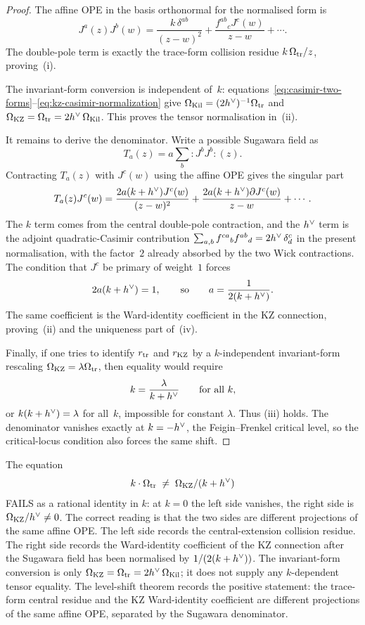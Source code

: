 \begin{proof}
The affine OPE in the basis orthonormal for the normalised form is
\[
 J^a(z)J^b(w)
 =
 \frac{k\,\delta^{ab}}{(z-w)^2}
 +\frac{f^{ab}{}_cJ^c(w)}{z-w}
 +\cdots .
\]
The double-pole term is exactly the trace-form collision residue
$k\,\Omega_{\mathrm{tr}}/z$, proving~(i).

The invariant-form conversion is independent of~$k$:
equations~\eqref{eq:casimir-two-forms}--\eqref{eq:kz-casimir-normalization}
give $\Omega_{\mathrm{Kil}}=(2h^{\vee})^{-1}\Omega_{\mathrm{tr}}$ and
$\Omega_{\mathrm{KZ}}=\Omega_{\mathrm{tr}}=2h^{\vee}\,\Omega_{\mathrm{Kil}}$. This proves the tensor
normalisation in~(ii).

It remains to derive the denominator. Write a possible Sugawara field
as
\[
 T_a(z)=a\sum_b :J^bJ^b:(z).
\]
Contracting $T_a(z)$ with $J^c(w)$ using the affine OPE gives the
singular part
\[
 T_a(z)J^c(w)
 =
 \frac{2a(k+h^{\vee})J^c(w)}{(z-w)^2}
 +\frac{2a(k+h^{\vee})\partial J^c(w)}{z-w}
 +\cdots .
\]
The $k$ term comes from the central double-pole contraction, and the
$h^{\vee}$ term is the adjoint quadratic-Casimir contribution
$\sum_{a,b} f^{ca}{}_b f^{ab}{}_d = 2h^{\vee}\,\delta^c_d$ in the present
normalisation, with the factor~$2$ already absorbed by the two Wick
contractions. The condition that $J^c$ be primary of weight~$1$ forces
\[
 2a(k+h^{\vee})=1,
 \qquad\text{so}\qquad
 a=\frac{1}{2(k+h^{\vee})}.
\]
The same coefficient is the Ward-identity coefficient in the KZ
connection, proving~(ii) and the uniqueness part of~(iv).

Finally, if one tries to identify $r_{\mathrm{tr}}$ and $r_{\mathrm{KZ}}$ by a
$k$-independent invariant-form rescaling $\Omega_{\mathrm{KZ}}=\lambda\Omega_{\mathrm{tr}}$,
then equality would require
\[
 k=\frac{\lambda}{k+h^{\vee}}
 \qquad\text{for all }k,
\]
or $k(k+h^{\vee})=\lambda$ for all~$k$, impossible for constant
$\lambda$. Thus (iii) holds. The denominator vanishes exactly at
$k=-h^{\vee}$, the Feigin--Frenkel critical level, so the critical-locus
condition also forces the same shift.
\end{proof}

\begin{remark}
\label{rem:basis-vs-identity}
The equation
\[
 k \cdot \Omega_{\mathrm{tr}} \;\neq\; \Omega_{\mathrm{KZ}} / (k + h^{\vee})
\]
FAILS as a rational identity in $k$: at $k = 0$ the left side vanishes,
the right side is $\Omega_{\mathrm{KZ}} / h^{\vee} \neq 0$. The correct reading is that
the two sides are different projections of the same affine OPE. The
left side records the central-extension collision residue. The right
side records the Ward-identity coefficient of the KZ connection after
the Sugawara field has been normalised by $1/(2(k+h^{\vee}))$. The
invariant-form conversion is only
	$\Omega_{\mathrm{KZ}}=\Omega_{\mathrm{tr}}=2h^{\vee}\,\Omega_{\mathrm{Kil}}$; it does not supply any
	$k$-dependent tensor equality. The level-shift theorem records the
	positive statement: the trace-form central residue and the KZ
	Ward-identity coefficient are different projections of the same affine
	OPE, separated by the Sugawara denominator.
\end{remark}

